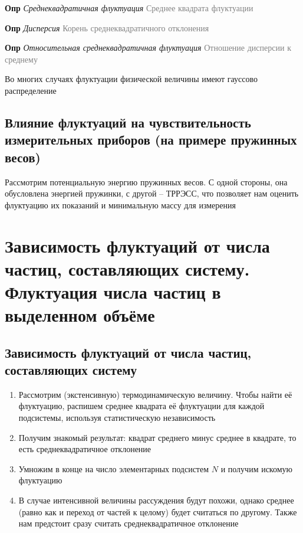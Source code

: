\documentclass[a4paper, 14pt]{article}
\begin{document}
    \textbf{Опр} \textit{Среднеквадратичная флуктуация} \textcolor{gray}{Среднее квадрата флуктуации}
    
    \textbf{Опр} \textit{Дисперсия} \textcolor{gray}{Корень среднеквадратичного отклонения}
    
    \textbf{Опр} \textit{Относительная среднеквадратичная флуктуация} \textcolor{gray}{Отношение дисперсии к среднему}
    
    Во многих случаях флуктуации физической величины имеют гауссово распределение
    
    \subsection{Влияние флуктуаций на чувствительность измерительных приборов (на примере пружинных весов)}
    
    Рассмотрим потенциальную энергию пружинных весов.
    С одной стороны, она обусловлена энергией пружинки, с другой -- ТРРЭСС, что позволяет нам оценить флуктуацию
    их показаний и минимальную массу для измерения
    
    \section{Зависимость флуктуаций от числа частиц, составляющих систему.
    Флуктуация числа частиц в выделенном объёме}
    
    \subsection{Зависимость флуктуаций от числа частиц, составляющих систему}
    
    \begin{enumerate}
        \item Рассмотрим (экстенсивную) термодинамическую величину.
        Чтобы найти её флуктуацию, распишем среднее квадрата её флуктуации для каждой подсистемы, используя
        статистическую независимость
        \item Получим знакомый результат: квадрат среднего минус среднее в квадрате, то есть среднеквадратичное
        отклонение
        \item Умножим в конце на число элементарных подсистем $N$ и получим искомую флуктуацию
        \item В случае интенсивной величины рассуждения будут похожи, однако среднее (равно как и переход от частей
        к целому) будет считаться по другому.
        Также нам предстоит сразу считать среднеквадратичное отклонение
    \end{enumerate}
    
\end{document}
